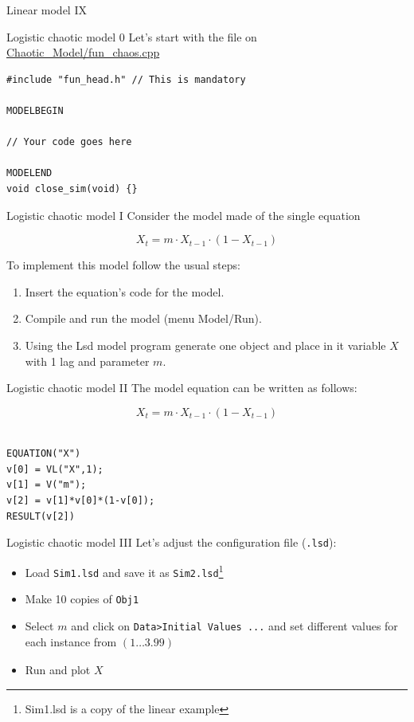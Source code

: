 \documentclass[bigger,aspectratio=169]{beamer}
\begin{document}
\begin{frame}[label={sec:org8724b8c}]{Linear model IX}
\begin{center}

\end{center}
\end{frame}
\begin{frame}[label={sec:org454c275},fragile]{Logistic chaotic model 0}
 Let's start with the file on \url{Chaotic\_Model/fun\_chaos.cpp}


\begin{verbatim}
#include "fun_head.h" // This is mandatory

MODELBEGIN

// Your code goes here

MODELEND
void close_sim(void) {}
\end{verbatim}
\end{frame}
\begin{frame}[label={sec:orga0c6abe}]{Logistic chaotic model I}
Consider the model made of the single equation

\[X_{t} = m\cdot X_{t-1}\cdot (1 - X_{t-1})\]

To implement this model follow the usual steps:
\begin{enumerate}
\item Insert the equation’s code for the model.
\item Compile and run the model (menu \alert{Model/Run}).
\item Using the Lsd model program generate one object and place in it variable \(X\) with 1 lag and parameter \(m\).
\end{enumerate}
\end{frame}
\begin{frame}[label={sec:org875bcb7},fragile]{Logistic chaotic model II}
 The model equation can be written as follows:

\[X_{t} = m\cdot X_{t-1}\cdot (1 - X_{t-1})\]

\begin{verbatim}

EQUATION("X")
v[0] = VL("X",1);
v[1] = V("m");
v[2] = v[1]*v[0]*(1-v[0]);
RESULT(v[2])
\end{verbatim}
\end{frame}
\begin{frame}[label={sec:orgc30f1fc},fragile]{Logistic chaotic model III}
 Let's adjust the configuration file (\texttt{.lsd}):

\begin{itemize}
\item Load \texttt{Sim1.lsd} and save it as \texttt{Sim2.lsd}\footnote{Sim1.lsd is a copy of the linear example}
\item Make \alert{10} copies of \texttt{Obj1}
\item Select \(m\) and click on \texttt{Data>Initial Values ...} and set different values for each instance from \((1 \ldots 3.99)_{}\)
\item Run and plot \(X\)
\end{itemize}
\end{frame}
\end{document}

